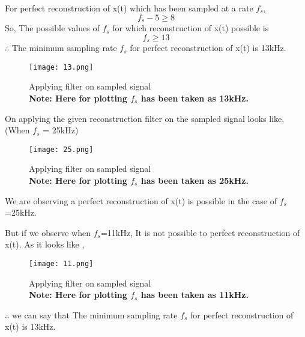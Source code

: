 \documentclass[journal,12pt,twocolumn]{IEEEtran}
\begin{document}
For perfect reconstruction of x(t) which has been sampled at a rate $f_s$, $$f_s-5 \ge 8$$
So, The possible values of $f_s$ for which reconstruction of x(t) possible is 
$$f_s \ge 13$$
$\therefore$ The minimum sampling rate $f_s$ for perfect reconstruction of x(t) is 13kHz.

\begin{figure}[!htp]
    \centering
    \texttt{[image: 13.png]}
    \caption{Applying filter on sampled signal
    \\\textbf{Note: Here for plotting $f_s$ has been taken as 13kHz.}}
\end{figure}


On applying the given reconstruction filter on the sampled signal looks like,
(When $f_s$ = 25kHz)
\begin{figure}[!htp]
    \centering
    \texttt{[image: 25.png]}
    \caption{Applying filter on sampled signal
    \\\textbf{Note: Here for plotting $f_s$ has been taken as 25kHz.}}
\end{figure}

We are observing a perfect reconstruction of x(t) is possible in the case of $f_s$=25kHz.

But if we observe when $f_s$=11kHz, It is not possible to perfect reconstruction of x(t). As it looks like ,
\begin{figure}[!htp]
    \centering
    \texttt{[image: 11.png]}
    \caption{Applying filter on sampled signal
    \\\textbf{Note: Here for plotting $f_s$ has been taken as 11kHz.}}
\end{figure}
$\therefore$ we can say that The minimum sampling rate $f_s$ for perfect reconstruction of x(t) is 13kHz.
\end{document}
